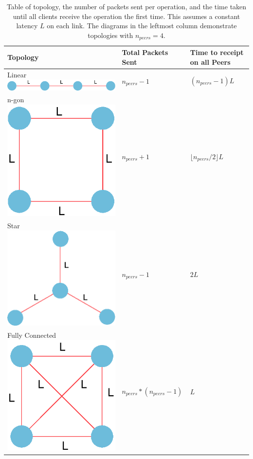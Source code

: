 \documentclass[12pt,a4paper,twoside,openright]{report}
\begin{document}
			\begin{table}[H]
			\centering
			\caption[Number of Packets in P2P Network] {Table of topology, the number of packets sent per operation, and the time taken until all clients receive the operation the first time. This assumes a constant latency $L$ on each link. The diagrams in the leftmost column demonstrate topologies with $n_{peers}=4$.}
			\label{tab:topologypackets}
			\setlength{\tabcolsep}{10pt}
			\begin{tabular}{@{}lll@{}}
			Topology		& Total Packets Sent            & Time to receipt on all Peers   \\ \toprule
			\makecell{Linear \\ \includegraphics[width=0.15\linewidth]{figs/linear_top.eps}  }        & $n_{peers} - 1$                   & $(n_{peers}-1)L$              \\ \midrule
			\makecell{n-gon  \\ \includegraphics[width=0.15\linewidth]{figs/ngon_top.eps} }        & $n_{peers}+1$                 & $\lfloor n_{peers}/2 \rfloor L$ \\ \midrule
			\makecell{Star  \\ \includegraphics[width=0.15\linewidth]{figs/star.eps} }         & $n_{peers} - 1$ 	                & $2L$                           \\ \midrule
			\makecell{Fully Connected  \\ \includegraphics[width=0.15\linewidth]{figs/fullyconnected.eps} } & $n_{peers} * (n_{peers} - 1)$ & $L$                 \\ \bottomrule          
			\end{tabular}
			\end{table}
			
\end{document}
